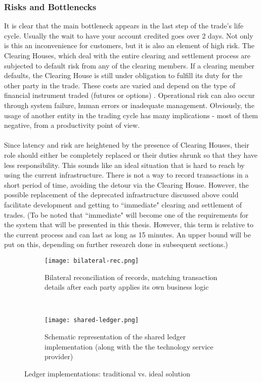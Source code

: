 \documentclass[12pt,twoside]{article}
\begin{document}
\subsubsection{Risks and Bottlenecks}
\label{sub:Risks}
It is clear that the main bottleneck appears in the last step of the trade's life cycle. Usually the wait to have your account credited goes over 2 days. Not only is this an inconvenience for customers, but it is also an element of high risk. The Clearing Houses, which deal with the entire clearing and settlement process are subjected to default risk from any of the clearing members. If a clearing member defaults, the Clearing House is still under obligation to fulfill its duty for the other party in the trade. These costs are varied and depend on the type of financial instrument traded (futures or options) \cite{CHRisk}. Operational risk can also occur through system failure, human errors or inadequate management. Obviously, the usage of another entity in the trading cycle has many implications - most of them negative, from a productivity point of view.
\\ \\
Since latency and risk are heightened by the presence of Clearing Houses, their role should either be completely replaced or their duties shrunk so that they have less responsibility. This sounds like an ideal situation that is hard to reach by using the current infrastructure. There is not a way to record transactions in a short period of time, avoiding the detour via the Clearing House. However, the possible replacement of the deprecated infrastructure discussed above could facilitate development and getting to ``immediate" clearing and settlement of trades. (To be noted that ``immediate" will become one of the requirements for the system that will be presented in this thesis. However, this term is relative to the current process and can last as long as 15 minutes. An upper bound will be put on this, depending on further research done in subsequent sections.) \\
\begin{figure}[!htb]
    \centering
    \begin{subfigure}[b]{0.48\textwidth}
    	\centering
        \texttt{[image: bilateral-rec.png]}
        \caption{Bilateral reconciliation of records, matching transaction details after each party applies its own business logic}
        \label{fig:bilateral}
    \end{subfigure}
    ~
    \begin{subfigure}[b]{0.48\textwidth}
    	\centering
        \texttt{[image: shared-ledger.png]}
        \caption{Schematic representation of the shared ledger implementation (along with the the technology service provider)}
        \label{fig:shared}
    \end{subfigure}
    \caption{Ledger implementations: traditional vs. ideal solution \cite{Corda:IP}}
    \label{fig:reconciliation}
\end{figure}
\end{document}
